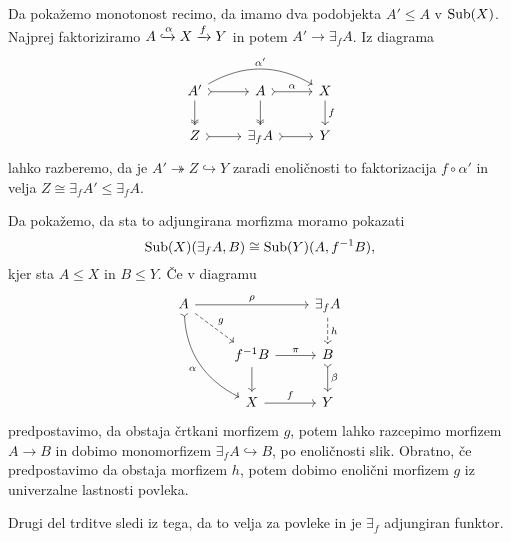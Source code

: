 \documentclass[../kategoricna_logika.tex]{subfiles}
\begin{document}
\begin{dokaz}
  Da pokažemo monotonost recimo, da imamo dva podobjekta $A' \leq A$ v
  $\operatorname{Sub}(X)$.  Najprej faktoriziramo
  $A \xhookrightarrow{\alpha} X \xrightarrow{f} Y$ in potem
  $A' \to \exists_f A$.  Iz diagrama
  \begin{equation*}
    \begin{tikzcd}
      A' \ar[d, two heads] \ar[r, tail] \ar[rr, bend left, "\alpha'"] &
      A \ar[d, two heads] \ar[r, tail, "\alpha"] & X \ar[d, "f"] \\
      Z \ar[r, tail] & \exists_f A \ar[r, tail] & Y
    \end{tikzcd}
  \end{equation*}
  lahko razberemo, da je $A' \twoheadrightarrow Z \hookrightarrow Y$
  zaradi enoličnosti to faktorizacija $f \circ \alpha'$ in velja
  $Z \cong \exists_f A' \leq \exists_f A$.

  Da pokažemo, da sta to adjungirana morfizma moramo pokazati
  $$\operatorname{Sub}(X)(\exists_f A, B) \cong \operatorname{Sub}(Y)(A, f^{-1}B),$$
  kjer sta $A \leq X$ in $B \leq Y$. Če v diagramu
  \begin{equation*}
    \begin{tikzcd}
      A \ar[ddr, bend right, tail, "\alpha"'] \ar[dr, dashed, "g"] \ar[rr, "\rho"] & &
      \exists_f A \ar[d, dashed, "h"] \\
      & f^{-1}B \ar[d] \ar[r, "\pi"] & B \ar[d, tail, "\beta"] \\
      & X \ar[r, "f"] & Y
    \end{tikzcd}
  \end{equation*}
  predpostavimo, da obstaja črtkani morfizem $g$, potem lahko
  razcepimo morfizem~$A \to B$ in dobimo monomorfizem
  $\exists_f A \hookrightarrow B$, po enoličnosti slik.  Obratno, če
  predpostavimo da obstaja morfizem $h$, potem dobimo enolični morfizem
  $g$ iz univerzalne lastnosti povleka.

  Drugi del trditve sledi iz tega, da to velja za povleke in je
  $\exists_f$ adjungiran funktor.
\end{dokaz}
%
\end{document}
